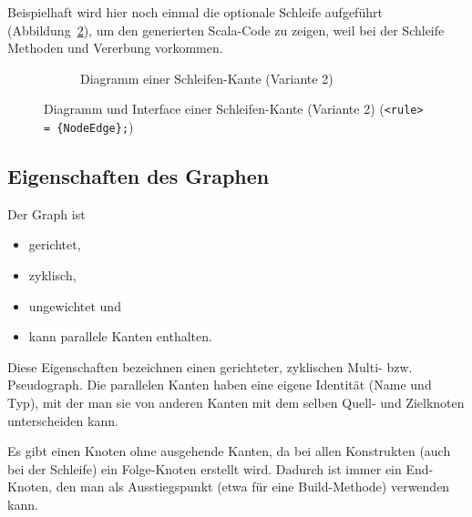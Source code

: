 \documentclass[../InterneDSLs.tex]{subfiles}
\begin{document}
Beispielhaft wird hier noch einmal die optionale Schleife aufgeführt (Abbildung~\ref{FIG:ScalaLoopNodeAlt}), um den generierten Scala-Code zu zeigen, weil bei der Schleife Methoden und Vererbung vorkommen.
\begin{figure}[ht]
\centering
  \begin{subfigure}[c]{0.49\textwidth}
    \caption{Diagramm einer Schleifen-Kante (Variante 2)}
    \label{FIG:ScalaDiagramLoopNodeAlt}
  \end{subfigure}
  \begin{subfigure}[c]{0.49\textwidth}
    
  \end{subfigure}
  \caption{Diagramm und Interface einer Schleifen-Kante (Variante 2) (\texttt{<rule> = \{NodeEdge\};})}
  \label{FIG:ScalaLoopNodeAlt}
\end{figure}


\subsection{Eigenschaften des Graphen}
Der Graph ist
\begin{itemize}
	\item gerichtet,
	\item zyklisch,
	\item ungewichtet und
	\item kann parallele Kanten enthalten.
\end{itemize}
Diese Eigenschaften bezeichnen einen gerichteter, zyklischen Multi- bzw. Pseudograph. Die parallelen Kanten haben eine eigene Identität (Name und Typ), mit der man sie von anderen Kanten mit dem selben Quell- und Zielknoten unterscheiden kann.

Es gibt einen Knoten ohne ausgehende Kanten, da bei allen Konstrukten (auch bei der Schleife) ein Folge-Knoten erstellt wird. Dadurch ist immer ein End-Knoten, den man als Ausstiegspunkt (etwa für eine Build-Methode) verwenden kann.
\end{document}
